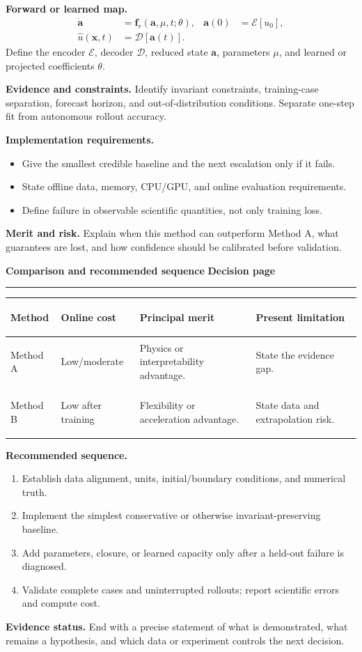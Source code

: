 \documentclass[10pt]{article}
\newcommand{\vect}[1]{\bm{#1}}
\newcommand{\MethodTitle}[2]{%
  {\Large\bfseries\color{routeblue}#1}\hfill
  {\normalsize\bfseries\color{routegray}#2}\par\vspace{2pt}
  \hrule\vspace{5pt}}
\begin{document}
\textbf{Forward or learned map.}
\begin{align}
 \dot{\vect a}&=\vect f_r(\vect a,\mu,t;\theta),
 &\vect a(0)&=\mathcal E[u_0],\label{eq:reduced-state}\\
 \widehat u(\vect x,t)&=\mathcal D[\vect a(t)] .
\end{align}
Define the encoder $\mathcal E$, decoder $\mathcal D$, reduced state $\vect a$, parameters $\mu$, and learned or projected coefficients $\theta$.

\textbf{Evidence and constraints.} Identify invariant constraints, training-case separation, forecast horizon, and out-of-distribution conditions. Separate one-step fit from autonomous rollout accuracy.

\textbf{Implementation requirements.}
\begin{itemize}
 \item Give the smallest credible baseline and the next escalation only if it fails.
 \item State offline data, memory, CPU/GPU, and online evaluation requirements.
 \item Define failure in observable scientific quantities, not only training loss.
\end{itemize}

\textbf{Merit and risk.} Explain when this method can outperform Method A, what guarantees are lost, and how confidence should be calibrated before validation.

\clearpage
\MethodTitle{Comparison and recommended sequence}{Decision page}

\begin{center}
\begin{tabularx}{\textwidth}{>{\bfseries\raggedright\arraybackslash}p{}L{0.14\textwidth}Y Y}
\toprule
Method & Online cost & Principal merit & Present limitation \\
\midrule
Method A & Low/moderate & Physics or interpretability advantage. & State the evidence gap. \\
Method B & Low after training & Flexibility or acceleration advantage. & State data and extrapolation risk. \\
\bottomrule
\end{tabularx}
\end{center}

\textbf{Recommended sequence.}
\begin{enumerate}
 \item Establish data alignment, units, initial/boundary conditions, and numerical truth.
 \item Implement the simplest conservative or otherwise invariant-preserving baseline.
 \item Add parameters, closure, or learned capacity only after a held-out failure is diagnosed.
 \item Validate complete cases and uninterrupted rollouts; report scientific errors and compute cost.
\end{enumerate}

\textbf{Evidence status.} End with a precise statement of what is demonstrated, what remains a hypothesis, and which data or experiment controls the next decision.
\end{document}
